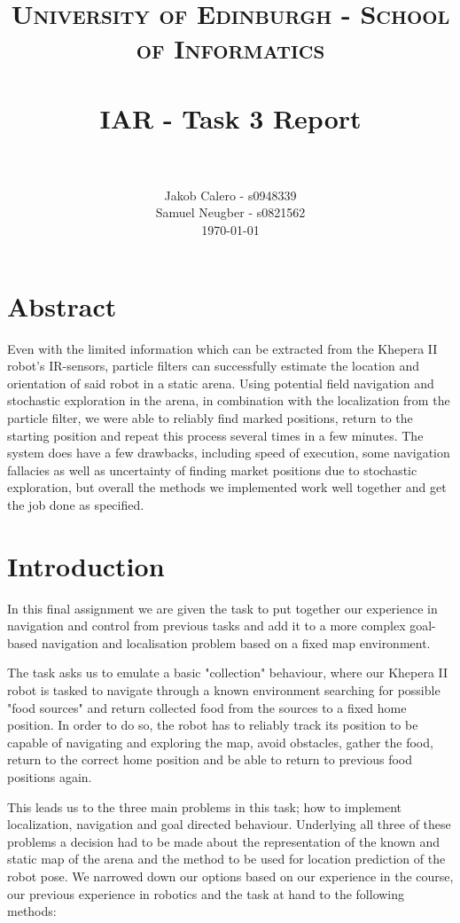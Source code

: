 \documentclass[paper=a4, fontsize=12pt]{scrartcl}	%
\title{
\vspace{-1in} 	
\usefont{OT1}{bch}{b}{n}
\normalfont \normalsize \textsc{University of Edinburgh - School of Informatics}
\\ [25pt]
\horrule{0.5pt} \\[0.4cm]
\large IAR - Task 3 Report \\
\horrule{1pt} \\[0.5cm]
}
\author{
  \normalfont \normalsize
  Jakob Calero - s0948339\\[-3pt]\normalsize
  Samuel Neugber - s0821562\\[-3pt]\normalsize
  \today
}
\date{}
\numberwithin{equation}{section}		%
\numberwithin{figure}{section}			%
\numberwithin{table}{section}				%
\begin{document}
\maketitle					%
\section{Abstract}
Even with the limited information which can be extracted from the Khepera II robot's IR-sensors, particle filters can successfully estimate the location and orientation of said robot in a static arena. Using potential field navigation and stochastic exploration in the arena, in combination with the localization from the particle filter, we were able to reliably find marked positions, return to the starting position and repeat this process several times in a few minutes. The system does have a few drawbacks, including speed of execution, some navigation fallacies as well as uncertainty of finding market positions due to stochastic exploration, but overall the methods we implemented work well together and get the job done as specified.

\section{Introduction}
In this final assignment we are given the task to put together our experience in navigation and control from previous tasks and add it to a more complex goal-based navigation and localisation problem based on a fixed map environment.

The task asks us to emulate a basic "collection" behaviour, where our Khepera II robot is tasked to navigate through a known environment searching for possible "food sources" and return collected food from the sources to a fixed home position. In order to do so, the robot has to reliably track its position to be capable of navigating and exploring the map, avoid obstacles, gather the food, return to the correct home position and be able to return to previous food positions again.

This leads us to the three main problems in this task; how to implement localization, navigation and goal directed behaviour. Underlying all three of these problems a decision had to be made about the representation of the known and static map of the arena and the method to be used for location prediction of the robot pose. We narrowed down our options based on our experience in the course, our previous experience in robotics and the task at hand to the following methods:
\end{document}
